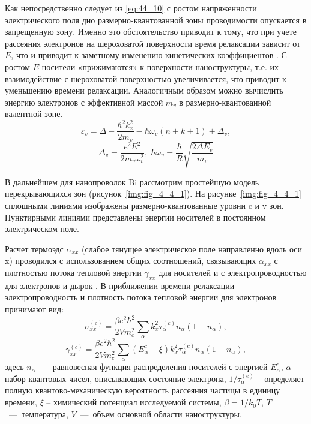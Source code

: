 Как непосредственно следует из \eqref{eq:44_10} с ростом напряженности электрического поля дно размерно-квантованной зоны проводимости опускается в запрещенную зону. Именно это обстоятельство приводит к тому, что при учете рассеяния электронов на шероховатой поверхности время релаксации зависит от $E$, что и приводит к заметному изменению кинетических коэффициентов \cite{Karapetyan2011}. С ростом $E$ носители «прижимаются» к поверхности наноструктуры, т.е. их взаимодействие с шероховатой поверхностью увеличивается, что приводит к уменьшению времени релаксации. Аналогичным образом можно вычислить энергию электронов с эффективной массой $m_v$ в размерно-квантованной валентной зоне.
\begin{equation} \label{eq:44_20}
\varepsilon_v =\Delta -\frac{\hbar^2 k_x^2 }{2m_v } -\hbar \omega_v \left(n+k+1\right)+\Delta_v ,
\end{equation} 
\[
\Delta_v =\frac{e^2 E^2 }{2m_v \omega_v^2 } ,\;
 \hbar \omega_v =\frac{\hbar }{R} \sqrt{\frac{2\Delta E_v }{m_v } } 
\] 
  
В дальнейшем для нанопроволок Bi рассмотрим простейшую модель перекрывающихся зон (рисунок~\ref{img:fig_4_4_1}). На рисунке~\ref{img:fig_4_4_1} сплошными линиями изображены  размерно-квантованные уровни c и v зон. Пунктирными линиями представлены энергии носителей в постоянном электрическом поле.

Расчет термоэдс $\alpha_{xx} $ (слабое тянущее электрическое поле направленно вдоль оси x) проводился с использованием общих соотношений, связывающих $\alpha_{xx} $ с плотностью потока тепловой энергии $\gamma_{xx} $ для носителей и с электропроводностью для электронов и дырок \cite{Kubo1957}. В приближении времени релаксации \cite{Khamidullin2002} электропроводность и плотность потока тепловой энергии для электронов принимают вид:
\begin{equation} \label{eq:44_30}
\sigma_{xx}^{(c)} =\frac{\beta e^2 \hbar^2 }{2Vm_c^2 } \sum_{\alpha }k_x^2 \tau_{\alpha }^{(c)} n_{\alpha } \left(1-n_{\alpha } \right),
\end{equation}
\begin{equation} \label{eq:44_31}
\gamma_{xx}^{(c)} =\frac{\beta e^2 \hbar^2 }{2V m_c^2 } \sum _{\alpha }\left(E_{\alpha }^c -\xi \right)k_x^2 \tau _{\alpha }^{(c)} n_{\alpha } \left(1-n_{\alpha } \right) ,
\end{equation}
здесь $n_{\alpha } $~---~равновесная функция распределения носителей с энергией $E_{\alpha }^c $, $\alpha $ -- набор квантовых чисел, описывающих состояние электрона, $1 / \tau_{\alpha }^{(e)} $ -- определяет полную квантово-механическую вероятность рассеяния частицы в единицу времени, $\xi $ -- химический потенциал исследуемой системы, $\beta =1 / k_0 T $, $T$~---~температура, $V$~---~объем основной области наноструктуры.
 
